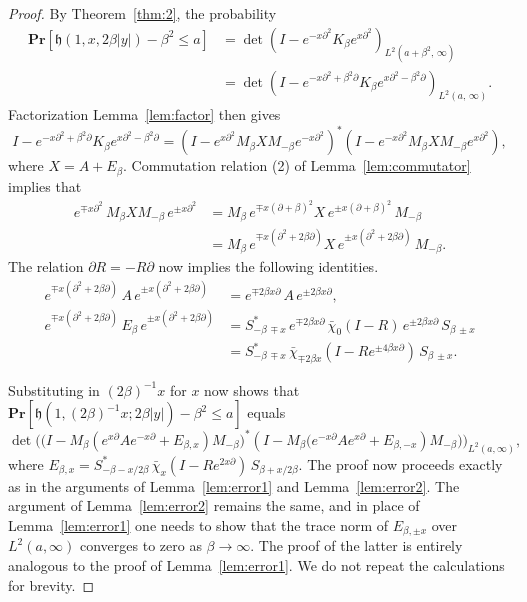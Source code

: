 \documentclass[10pt]{amsart}
\theoremstyle{definition}\newtheorem{defi}[theo]{Definition}\newtheorem{rema}[theo]{Remark}\newtheorem{exam}[theo]{Example}\newtheorem{exem}[theo]{Example}\newtheorem{nota}[theo]{Notation}
\newcommand{\pr}[1]{\mathbf{Pr}\left[#1\right]}
\newcommand{\h}{\mathfrak{h}}
\begin{document}
\begin{proof}
By Theorem~\ref{thm:2}, the probability
\begin{align*}
\pr{\h(1,x, 2\beta|y|) - \beta^2 \leq a} &=
\det \left (I - e^{- x \partial^2} K_{\beta} e^{x \partial^2} \right)_{L^2(a+\beta^2,\,\infty)}\\
& = \det \left (I - e^{- x \partial^2+\beta^2 \partial} K_{\beta} e^{x \partial^2 -\beta^2 \partial} \right)_{L^2(a,\, \infty)}.
\end{align*}
Factorization Lemma~\ref{lem:factor} then gives
\[
I - e^{- x \partial^2+\beta^2 \partial} K_{\beta} e^{x \partial^2 -\beta^2 \partial} =
\left (I - e^{x \partial^2} M_{\beta} X M_{-\beta} e^{-x\partial^2} \right)^*
\left (I - e^{-x \partial^2} M_{\beta} X M_{-\beta} e^{x\partial^2} \right),
\]
where $X = A + E_{\beta}$. Commutation relation (2) of Lemma~\ref{lem:commutator} implies that
\begin{align*}
e^{\mp x \partial^2} \, M_{\beta} X M_{- \beta} \, e^{\pm x\partial^2} &= M_{\beta} \, e^{\mp x (\partial+\beta)^2} X \, e^{\pm x(\partial+\beta)^2} \, M_{-\beta} \\
& = M_{\beta} \, e^{\mp x(\partial^2 + 2\beta \partial)} X \, e^{\pm x(\partial^2+ 2 \beta \partial)} \, M_{-\beta}.
\end{align*}
The relation $\partial R = - R \partial$ now implies the following identities.
\begin{align*}
e^{\mp x(\partial^2+2 \beta \partial)} \, A \, e^{\pm x(\partial^2 +2\beta \partial)} &= e^{\mp 2\beta x \partial} \, A \, e^{\pm 2\beta x \partial},\\
e^{\mp x(\partial^2+2 \beta \partial)} \, E_{\beta} \, e^{\pm x(\partial^2 +2\beta \partial)} & = S^{*}_{- \beta \, \mp x} \, e^{\mp 2\beta x \partial} \, \bar{\chi}_0 (I-R) \, e^{\pm 2\beta x \partial} \, S_{\beta \, \pm x} \\
&= S^{*}_{- \beta \, \mp x} \, \bar{\chi}_{\mp 2\beta x}(I - Re^{\pm 4\beta x \partial}) \, S_{\beta \, \pm x}.
\end{align*}

Substituting in $(2\beta)^{-1}x $ for $x$ now shows that $\pr{\h(1,(2 \beta)^{-1}x; 2\beta|y|) - \beta^2 \leq a}$ equals
\[
\det \Big (\big(I - M_{\beta} (e^{x \partial}Ae^{-x\partial} + E_{\beta,x}) M_{-\beta} \big)^{*}
(I - M_{\beta} \big (e^{-x \partial}Ae^{x\partial} + E_{\beta,-x}) M_{-\beta} \big) \Big)_{L^2(a,\infty)},
\]
where $E_{\beta,x} = S^{*}_{-\beta - x/2\beta} \, \bar{\chi}_{x}(I-Re^{2x \partial}) \, S_{\beta + x/2\beta}$. The proof now proceeds exactly as in the arguments of Lemma~\ref{lem:error1} and Lemma~\ref{lem:error2}. The argument of Lemma~\ref{lem:error2} remains the same, and in place of Lemma~\ref{lem:error1} one needs to show that the trace norm of $E_{\beta,\pm x}$ over $L^2(a,\infty)$ converges to zero as $\beta \to \infty$. The proof of the latter is entirely analogous to the proof of Lemma~\ref{lem:error1}. We do not repeat the calculations for brevity.


\end{proof}
\end{document}
